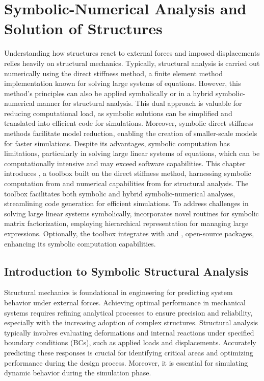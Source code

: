 
\chapter{Symbolic-Numerical Analysis and Solution of Structures}
\label{app4:trussme}

Understanding how structures react to external forces and imposed displacements relies heavily on structural mechanics. Typically, structural analysis is carried out numerically using the direct stiffness method, a finite element method implementation known for solving large systems of equations. However, this method's principles can also be applied symbolically or in a hybrid symbolic-numerical manner for structural analysis. This dual approach is valuable for reducing computational load, as symbolic solutions can be simplified and translated into efficient code for simulations. Moreover, symbolic direct stiffness methods facilitate model reduction, enabling the creation of smaller-scale models for faster simulations. Despite its advantages, symbolic computation has limitations, particularly in solving large linear systems of equations, which can be computationally intensive and may exceed software capabilities. This chapter introduces \TrussMe{}, a toolbox built on the direct stiffness method, harnessing symbolic computation from \Maple{} and numerical capabilities from \Matlab{} for structural analysis. The toolbox facilitates both symbolic and hybrid symbolic-numerical analyses, streamlining code generation for efficient simulations. To address challenges in solving large linear systems symbolically, \TrussMe{} incorporates novel routines for symbolic matrix factorization, employing hierarchical representation for managing large expressions. Optionally, the toolbox integrates with \LEM{} and \LAST{}, open-source \Maple{} packages, enhancing its symbolic computation capabilities.


\section{Introduction to Symbolic Structural Analysis}
\label{app4:sec:introduction}

Structural mechanics is foundational in engineering for predicting system behavior under external forces. Achieving optimal performance in mechanical systems requires refining analytical processes to ensure precision and reliability, especially with the increasing adoption of complex structures. Structural analysis typically involves evaluating deformations and internal reactions under specified boundary conditions (\acp{BC}), such as applied loads and displacements. Accurately predicting these responses is crucial for identifying critical areas and optimizing performance during the design process. Moreover, it is essential for simulating dynamic behavior during the simulation phase.


